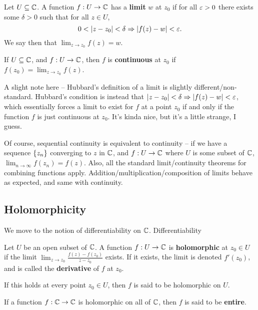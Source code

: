 \begin{definition}
  Let $U \subseteq \mathbb C$. A function $f : U \to \mathbb C$ has a \textbf{limit} $w$ at $z_0$ if for all $\varepsilon > 0$ there exists some $\delta > 0$ such that for all $z \in U$, \[ 0 < | z - z_0 | < \delta \Rightarrow |f(z) - w| < \varepsilon .\] We say then that $\lim_{z \to z_0} f(z) = w$.
\end{definition}
\begin{definition}
  If $U \subseteq \mathbb C$, and $f : U \to \mathbb C$, then $f$ is \textbf{continuous} at $z_0$ if $f(z_0) = \lim_{z \to z_0} f(z)$.
\end{definition}
A slight note here -- Hubbard's definition of a limit is slightly different/non-standard. Hubbard's condition is instead that $ | z - z_0 | < \delta \Rightarrow |f(z) - w| < \varepsilon$, which essentially forces a limit to exist for $f$ at a point $z_0$ if and only if the function $f$ is just continuous at $z_0$. It's kinda nice, but it's a little strange, I guess.

Of course, sequential continuity is equivalent to continuity -- if we have a sequence $\left\{ z_n \right\}$ converging to $z$ in $\mathbb C$, and $f : U \to \mathbb C$ where $U$ is some subset of $\mathbb C$, $\lim_{n \to \infty} f(z_n) = f(z)$. Also, all the standard limit/continuity theorems for combining functions apply. Addition/multiplication/composition of limits behave as expected, and same with continuity.


\subsection{Holomorphicity}
We move to the notion of differentiability on $\mathbb C$. Differentiability

\begin{definition}
  Let $U$ be an open subset of $\mathbb C$. A function $f : U \to \mathbb C$ is \textbf{holomorphic} at $z_0 \in U$ if the limit $\lim_{z \to z_0} \frac{f(z) - f(z_0)}{z - z_0}$ exists. If it exists, the limit is denoted $f'(z_0)$, and is called the \textbf{derivative} of $f$ at $z_0$.

  If this holds at every point $z_0 \in U$, then $f$ is said to be holomorphic on $U$.
\end{definition}

\begin{definition}
  If a function $f : \mathbb C \to \mathbb C$ is holomorphic on all of $\mathbb C$, then $f$ is said to be \textbf{entire}.
\end{definition}



